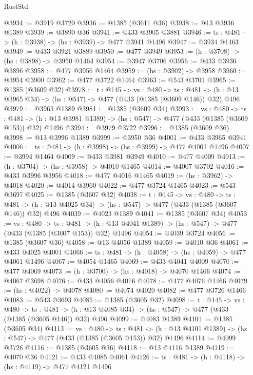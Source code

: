\begin{lexlean}{RustStd}
\begin{coremodule}
@3934 := @3919 @3720
@3936 := @1385 (@3611 @36)
@3938 := @13 @3936 @1389
@3939 := @3890 @36
@3941 := @433 @3905 @3881
@3946 := {ts : @481} -> (h : @3938) -> (hs : @3939) -> @477 @3941 @1496
@3947 := @3934 @1463
@3949 := @433 @3921 @3889
@3950 := @477 @3949
@3953 := (h : @3708) -> (hs : @3898) -> @3950 @1464
@3954 := @3947 @3706
@3956 := @433 @3936 @3896
@3958 := @477 @3956 @1464
@3959 := (hs : @3902) -> @3958
@3960 := @3954 @3900
@3962 := @477 @3722 @1464
@3963 := @543 @3701
@3965 := @1385 (@3609 @32)
@3978 := {t : @145} ->
  {vs : @480} ->
  {ts : @481} -> (h : @13 @3965 @34) -> (hs : @547) -> @477 (@433 (@1385 (@3609 @146)) @32) @496
@3979 := @3963 @1389
@3981 := @1385 (@3609 @34)
@3993 := {vs : @480} ->
  {ts : @481} -> (h : @13 @3981 @1389) -> (hs : @547) -> @477 (@433 (@1385 (@3609 @153)) @32) @1496
@3994 := @3979 @3722
@3996 := @1385 (@3609 @36)
@3998 := @13 @3996 @1389
@3999 := @3950 @36
@4001 := @433 @3965 @3941
@4006 := {ts : @481} -> (h : @3998) -> (hs : @3999) -> @477 @4001 @1496
@4007 := @3994 @1464
@4009 := @433 @3981 @3949
@4010 := @477 @4009
@4013 := (h : @3704) -> (hs : @3958) -> @4010 @1465
@4014 := @4007 @3702
@4016 := @433 @3996 @3956
@4018 := @477 @4016 @1465
@4019 := (hs : @3962) -> @4018
@4020 := @4014 @3960
@4022 := @477 @3724 @1465
@4023 := @543 @3697
@4025 := @1385 (@3607 @32)
@4038 := {t : @145} ->
  {vs : @480} ->
  {ts : @481} -> (h : @13 @4025 @34) -> (hs : @547) -> @477 (@433 (@1385 (@3607 @146)) @32) @496
@4039 := @4023 @1389
@4041 := @1385 (@3607 @34)
@4053 := {vs : @480} ->
  {ts : @481} -> (h : @13 @4041 @1389) -> (hs : @547) -> @477 (@433 (@1385 (@3607 @153)) @32) @1496
@4054 := @4039 @3724
@4056 := @1385 (@3607 @36)
@4058 := @13 @4056 @1389
@4059 := @4010 @36
@4061 := @433 @4025 @4001
@4066 := {ts : @481} -> (h : @4058) -> (hs : @4059) -> @477 @4061 @1496
@4067 := @4054 @1465
@4069 := @433 @4041 @4009
@4070 := @477 @4069
@4073 := (h : @3700) -> (hs : @4018) -> @4070 @1466
@4074 := @4067 @3698
@4076 := @433 @4056 @4016
@4078 := @477 @4076 @1466
@4079 := (hs : @4022) -> @4078
@4080 := @4074 @4020
@4082 := @477 @3726 @1466
@4083 := @543 @3693
@4085 := @1385 (@3605 @32)
@4098 := {t : @145} ->
  {vs : @480} ->
  {ts : @481} -> (h : @13 @4085 @34) -> (hs : @547) -> @477 (@433 (@1385 (@3605 @146)) @32) @496
@4099 := @4083 @1389
@4101 := @1385 (@3605 @34)
@4113 := {vs : @480} ->
  {ts : @481} -> (h : @13 @4101 @1389) -> (hs : @547) -> @477 (@433 (@1385 (@3605 @153)) @32) @1496
@4114 := @4099 @3726
@4116 := @1385 (@3605 @36)
@4118 := @13 @4116 @1389
@4119 := @4070 @36
@4121 := @433 @4085 @4061
@4126 := {ts : @481} -> (h : @4118) -> (hs : @4119) -> @477 @4121 @1496

\end{coremodule}
\end{lexlean}

